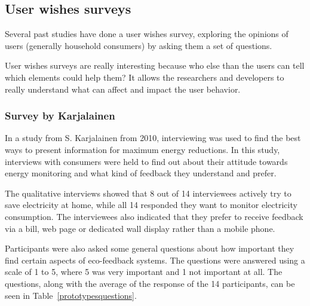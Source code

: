 \documentclass[journal]{vgtc}                %
\begin{document}
\subsection{User wishes surveys}
Several past studies have done a user wishes survey, exploring the opinions of users (generally household consumers) by asking them a set of questions. 

User wishes surveys are really interesting because who else than the users can tell which elements could help them? It allows the researchers and developers to really understand what can affect and impact the user behavior.

\subsubsection{Survey by Karjalainen}
In a study from S. Karjalainen \cite{karjalainen2011consumer} from 2010, interviewing was used to find the best ways to present information for maximum energy reductions. In this study, interviews with consumers were held to find out about their attitude towards energy monitoring and what kind of feedback they understand and prefer.

The qualitative interviews showed that 8 out of 14 interviewees actively try to save electricity at home, while all 14 responded they want to monitor electricity consumption. The interviewees also indicated that they prefer to receive feedback via a bill, web page or dedicated wall display rather than a mobile phone.

Participants were also asked some general questions about how important they find certain aspects of eco-feedback systems. The questions were answered using a scale of 1 to 5, where 5 was very important and 1 not important at all. The questions, along with the average of the response of the 14 participants, can be seen in Table~\ref{prototypesquestions}.
\end{document}
